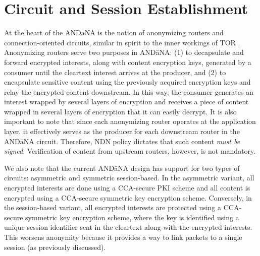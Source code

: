 \documentclass[10pt]{article}
\begin{document}

\section{Circuit and Session Establishment}
At the heart of the {\sf AND\=aNA} is the notion of anonymizing routers and connection-oriented circuits, similar in spirit to the inner workings of TOR \cite{tor}. Anonymizing routers serve two purposes in {\sf AND\=aNA}: (1) to decapsulate and forward encrypted interests, along with content encryption keys, generated by a consumer until the cleartext interest arrives at the producer, and (2) to encapsulate sensitive content using the previously acquired encryption keys and relay the encrypted content downstream. In this way, the consumer generates an interest wrapped by several layers of encryption and receives a piece of content wrapped in several layers of encryption that it can easily decrypt. It is also important to note that since each anonymizing router operates at the application layer, it effectively serves as the producer for each downstream router in the {\sf AND\=aNA} circuit. Therefore, NDN policy dictates that such content \emph{must be signed}. Verification of content from upstream routers, however, is not mandatory. 

We also note that the current {\sf AND\=aNA} design has support for two types of circuits: asymmetric and symmetric session-based. In the asymmetric variant, all encrypted interests are done using a CCA-secure PKI scheme and all content is encrypted using a CCA-secure symmetric key encryption scheme. Conversely, in the session-based variant, all encrypted interests are protected using a CCA-secure symmetric key encryption scheme, where the key is identified using a unique session identifier sent in the cleartext along with the encrypted interests. This worsens anonymity because it provides a way to link packets to a single session (as previously discussed).
\end{document}
